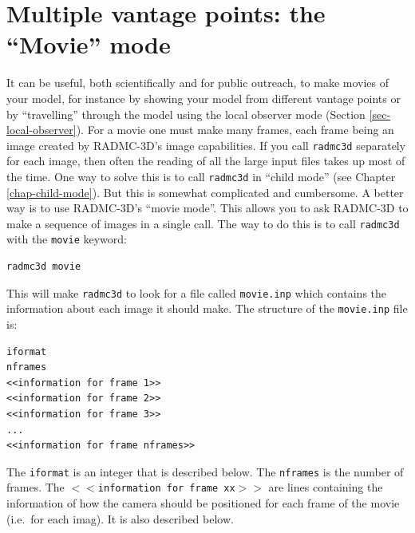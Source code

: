 \documentclass{report}
\newenvironment{asciibox}%
  {\begin{list}{}{%
    \setlength{\topsep}{0.5em}%
    \setlength{\parskip}{0em}%
    \setlength{\parsep}{0em}%
    \setlength{\itemsep}{0em}%
    \setlength{\rightmargin}{0em}%
    \setlength{\leftmargin}{3.0em}%
    \setlength{\labelsep}{1em}%
    \setlength{\labelwidth}{2em}%
  }\normalfont\footnotesize\item}
  {\end{list}}
\begin{document}
\section{Multiple vantage points: the ``Movie'' mode}
\label{sec-movie-mode}
%
It can be useful, both scientifically and for public outreach, to make
movies of your model, for instance by showing your model from different
vantage points or by ``travelling'' through the model using the local
observer mode (Section \ref{sec-local-observer}). For a movie one must
make many frames, each frame being an image created by RADMC-3D's image
capabilities. If you call {\small\tt radmc3d} separately for each
image, then often the reading of all the large input files takes up
most of the time. One way to solve this is to call {\small\tt radmc3d}
in ``child mode'' (see Chapter \ref{chap-child-mode}). But this is 
somewhat complicated and cumbersome. A better way is to use RADMC-3D's
``movie mode''. This allows you to ask RADMC-3D to make a sequence of
images in a single call. The way to do this is to call {\small\tt radmc3d}
with the {\small\tt movie} keyword:
{\small\begin{verbatim}
radmc3d movie
\end{verbatim}}
This will make {\small\tt radmc3d} to look for a file called 
{\small\tt movie.inp} which contains the information about each image
it should make. The structure of the {\small\tt movie.inp} file is:
\begin{asciibox}\begin{verbatim}
iformat
nframes
<<information for frame 1>>
<<information for frame 2>>
<<information for frame 3>>
...
<<information for frame nframes>>
\end{verbatim}\end{asciibox}
The {\small\tt iformat} is an integer that is described below.  The
{\small\tt nframes} is the number of frames. The {\small\tt $<<$information
  for frame xx$>>$} are lines containing the information of how the camera
should be positioned for each frame of the movie (i.e.\ for each imag). It
is also described below.
\end{document}
